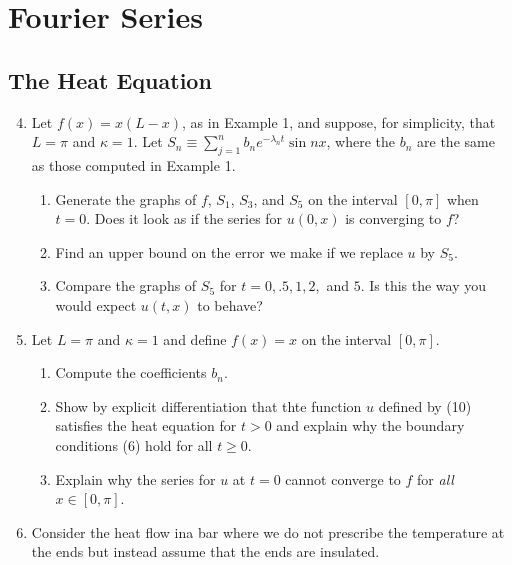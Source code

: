 \documentclass{article}
\begin{document}
\setcounter{section}{8}
\section{Fourier Series}

\subsection{The Heat Equation}

\begin{enumerate}
      \setcounter{enumi}{3}
      \item Let $f(x)=x(L-x)$, as in Example 1, and suppose, for simplicity, that
            $L=\pi$ and $\kappa=1$. Let $S_n\equiv \sum_{j=1}^nb_ne^{-\lambda_nt}\sin nx$,
            where the $b_n$ are the same as those computed in Example 1.
            \begin{enumerate}
                  \item Generate the graphs of $f$, $S_1$, $S_3$, and $S_5$ on the interval
                        $[0,\pi]$ when $t=0$. Does it look as if the series for $u(0,x)$ is
                        converging to $f$?
                  \item Find an upper bound on the error we make if we replace $u$ by $S_5$.
                  \item Compare the graphs of $S_5$ for $t=0,.5,1,2,$ and $5$. Is this the
                        way you would expect $u(t,x)$ to behave?
            \end{enumerate}
      \item Let $L=\pi$ and $\kappa=1$ and define $f(x)=x$ on the interval $[0,\pi]$.
            \begin{enumerate}
                  \item Compute the coefficients $b_n$.
                  \item Show by explicit differentiation that thte function $u$ defined by
                        (10) satisfies the heat equation for $t>0$ and explain why the
                        boundary conditions (6) hold for all $t\geq 0$.
                  \item Explain why the series for $u$ at $t=0$ cannot converge to $f$ for
                        \textit{all} $x\in [0,\pi]$.
            \end{enumerate}
            \setcounter{enumi}{6}
      \item Consider the heat flow ina  bar where we do not prescribe the temperature
            at the ends but instead assume that the ends are insulated.

\end{enumerate}
\end{document}
